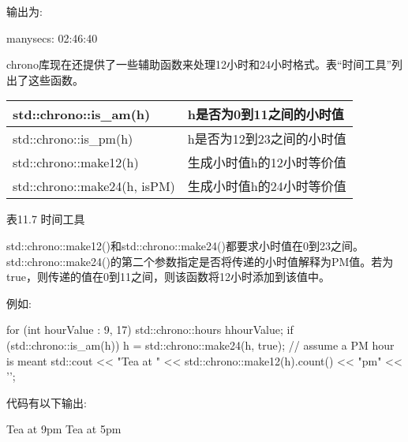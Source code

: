 输出为:

\begin{shell}
manysecs: 02:46:40
\end{shell}


chrono库现在还提供了一些辅助函数来处理12小时和24小时格式。表“时间工具”列出了这些函数。

\begin{longtable}[c]{|l|l|}
\hline
std::chrono::is\_am(h)       & h是否为0到11之间的小时值  \\ \hline
\endfirsthead
%
\endhead
%
std::chrono::is\_pm(h)       & h是否为12到23之间的小时值 \\ \hline
std::chrono::make12(h)       & 生成小时值h的12小时等价值   \\ \hline
std::chrono::make24(h, isPM) & 生成小时值h的24小时等价值   \\ \hline
\end{longtable}

\begin{center}
表11.7 时间工具
\end{center}

std::chrono::make12()和std::chrono::make24()都要求小时值在0到23之间。std::chrono::make24()的第二个参数指定是否将传递的小时值解释为PM值。若为true，则传递的值在0到11之间，则该函数将12小时添加到该值中。

例如:

\begin{cpp}
for (int hourValue : {9, 17}) {
	std::chrono::hours h{hourValue};
	if (std::chrono::is_am(h)) {
		h = std::chrono::make24(h, true); // assume a PM hour is meant
	}
	std::cout << "Tea at " << std::chrono::make12(h).count() << "pm" << '\n';
}
\end{cpp}

代码有以下输出:

\begin{shell}
Tea at 9pm
Tea at 5pm
\end{shell}










